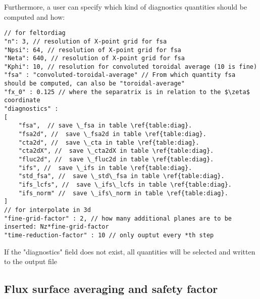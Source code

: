 Furthermore, a user can specify which kind of diagnostics quantities should be computed and how:
\begin{verbatim}
// for feltordiag
"n": 3, // resolution of X-point grid for fsa
"Npsi": 64, // resolution of X-point grid for fsa
"Neta": 640, // resolution of X-point grid for fsa
"Kphi": 10, // resolution for convoluted toroidal average (10 is fine)
"fsa" : "convoluted-toroidal-average" // From which quantity fsa should be computed, can also be "toroidal-average"
"fx_0" : 0.125 // where the separatrix is in relation to the $\zeta$ coordinate
"diagnostics" :
[
    "fsa",  // save \_fsa in table \ref{table:diag}.
    "fsa2d", //  save \_fsa2d in table \ref{table:diag}.
    "cta2d", //  save \_cta in table \ref{table:diag}.
    "cta2dX", //  save \_cta2dX in table \ref{table:diag}.
    "fluc2d", //  save \_fluc2d in table \ref{table:diag}.
    "ifs", //  save \_ifs in table \ref{table:diag}.
    "std_fsa", //  save \_std\_fsa in table \ref{table:diag}.
    "ifs_lcfs", //  save \_ifs\_lcfs in table \ref{table:diag}.
    "ifs_norm" //  save \_ifs\_norm in table \ref{table:diag}.
]
// for interpolate in 3d
"fine-grid-factor" : 2, // how many additional planes are to be inserted: Nz*fine-grid-factor
"time-reduction-factor" : 10 // only ouptut every *th step
\end{verbatim}
\begin{tcolorbox}[title=Note]
    If the "diagnostics" field does not exist, all quantities will be selected and written to the output file
\end{tcolorbox}


\subsection{Flux surface averaging and safety factor}
